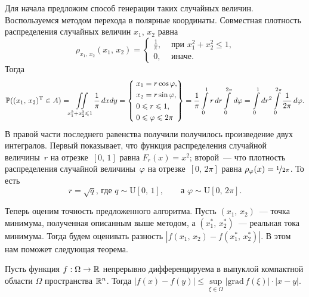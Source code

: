 Для начала предложим способ генерации таких случайных величин. Воспользуемся методом перехода в полярные координаты. Совместная плотность распределения случайных величин $x_1$, $x_2$ равна
$$
        \rho_{x_1,\,x_2}(x_1,\,x_2)
        =
        \begin{cases}
\frac{1}{\pi},
&
\mbox{ при $x_1^2 + x_2^2 \leqslant 1$,}
\\
0,
&
\mbox{ иначе.}
        \end{cases}
$$
Тогда
$$
        \mathbb{P}((x_1,\,x_2)^{\mathrm{T}} \in A)
=
        \iint\limits_{x_1^2 + x_2^2 \leqslant 1} \frac{1}{\pi}\,dxdy
=
        \left\{
\begin{aligned}
        &\; x_1 = r \cos\varphi, \\
        &\; x_2 = r \sin\varphi, \\
        &\; 0 \leqslant r \leqslant 1, \\
        &\; 0 \leqslant \varphi \leqslant 2\pi
\end{aligned}
        \right\}
=
        \frac{1}{\pi}\int\limits_{0}^{1}r\,dr \int\limits_0^{2\pi}\,d\varphi
=
        \int\limits_0^1 dr^2 \int\limits_0^{2\pi} \frac{1}{2\pi}\,d\varphi.
$$
В правой части последнего равенства получили получилось произведение двух интегралов. Первый показывает, что функция распределения случайной величины~$r$ на отрезке~$[0,\,1]$ равна $F_r(x) = x^2$; второй~--- что плотность распределения случайной величины~$\varphi$ на отрезке~$[0,\,2\pi]$ равна $\rho_\varphi(x) = \nicefrac{1}{2\pi}$. То есть
$$
        r = \sqrt{q}\mbox{, где }q \sim \mbox{U}[0,\,1],
\qquad
        \mbox{а }
        \varphi \sim \mbox{U}[0,\,2\pi].
$$

Теперь оценим точность предложенного алгоритма. Пусть $(x_1,\,x_2)$~--- точка минимума, полученная описанным выше методом, а $(x_1^*,\,x_2^*)$~--- реальная тока минимума. Тогда будем оценивать разность $|f(x_1,\,x_2) - f(x_1^*,\,x_2^*)|$. В этом нам поможет следующая теорема.

\begin{theorem}
        Пусть функция $f:\Omega \to \mathbb{R}$ непрерывно дифференцируема в выпуклой компактной области $\Omega$ пространства $\mathbb{R}^n$. Тогда $|f(x) - f(y)| \leqslant \sup\limits_{\xi\in\Omega}|\mbox{grad}\,f(\xi)|\cdot|x - y|$. 
\end{theorem}

